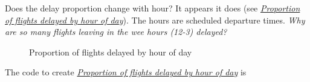 \documentclass[letterpaper,10pt,english]{sphinxmanual}
\begin{document}
Does the delay proportion change with hour? It appears it does (see \hyperref[airline:delay-by-hour]{\emph{Proportion of flights delayed by hour of day}}). The hours are scheduled
departure times. \emph{Why are so many flights leaving in the wee hours (12-3) delayed?}
\label{airline:delay-by-hour}\begin{figure}[htbp]
\centering

\caption{Proportion of flights delayed by hour of day}\end{figure}

The code to create \hyperref[airline:delay-by-hour]{\emph{Proportion of flights delayed by hour of day}} is
\end{document}
